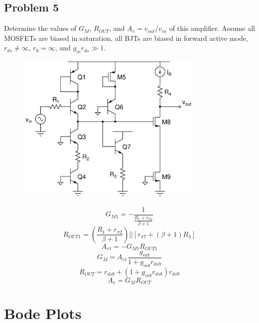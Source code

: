 \documentclass{article}
\begin{document}
\subsection*{Problem 5}
Determine the values of $G_M$, $R_{OUT}$, and $A_v = v_{out}/v_{in}$ of this amplifier.  Assume all MOSFETs are biased in saturation, all BJTs are biased in forward active mode, $r_{ds} \ne \infty$, $r_0 = \infty$, and $g_mr_{ds} \gg 1$. 
\begin{figure}[!h]
\begin{center}
    \includegraphics[width=0.8\textwidth]{figures/cc_amp5.jpg}
\end{center}
\end{figure}
$$G_{M1} = -\frac{1}{\frac{R_1 + r_{\pi2}}{\beta + 1} }$$
$$R_{OUT1}=\left(\frac{R_1 + r_{\pi2}}{\beta + 1}\right)||\left[r_{\pi 7} + (\beta + 1)R_3\right]$$
$$A_{v1} = -G_{M1}R_{OUT1}$$
$$\boxed{G_{M} = A_{v1}\frac{g_{m8}}{1 + g_{m8}r_{ds9}}}$$
$$\boxed{R_{OUT} = r_{ds8} + (1+g_{m8}r_{ds8})r_{ds9}}$$
$$\boxed{A_{v} = G_{M}R_{OUT}}$$

\newpage
\section*{Bode Plots}
\end{document}
